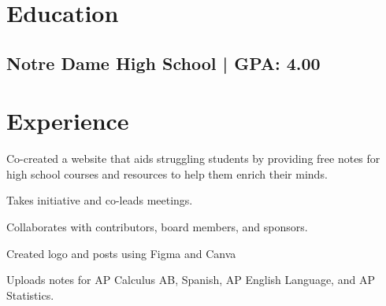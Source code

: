 \documentclass[]{deedy-resume-openfont}
\begin{document}
%
%
\lastupdated

%
%

%
%
\begin{minipage}[t]{0.66\textwidth} 



\section{Education} 
\subsection{Notre Dame High School | GPA: 4.00}



\section{Experience}
\vspace{\topsep}
\begin{tightemize}
\item Co-created a website that aids struggling students by providing free notes for high school courses and resources to help them enrich their minds.
\item Takes initiative and co-leads meetings.
\item Collaborates with contributors, board members, and sponsors.
\item Created logo and posts using Figma and Canva
\item Uploads notes for AP Calculus AB, Spanish, AP English Language, and AP Statistics.
\end{tightemize}
\sectionsep




\end{minipage}
\end{document}
